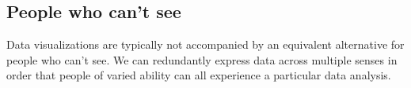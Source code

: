 \documentclass{acm_proc_article-sp}
\begin{document}
\subsection{People who can't see}
Data visualizations are typically not accompanied by an equivalent
alternative for people who can't see. We can redundantly express data
across multiple senses in order that people of varied ability can all
experience a particular data analysis.



\balancecolumns
\end{document}
